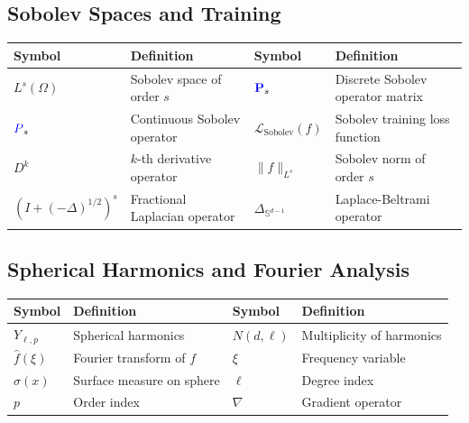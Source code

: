 \documentclass[a4paper]{article}
\theoremstyle{plain}
\theoremstyle{definition}
\theoremstyle{remark}
\begin{document}
\begin{tcolorbox}[colback=blue!5,colframe=blue!50!black,title={\large \textbf{Mathematical Notation Reference}},enhanced,drop shadow]

\newpage
\subsection*{Sobolev Spaces and Training}
\begin{longtable}{p{}p{}p{}p{}}
\toprule
\textbf{Symbol} & \textbf{Definition} & \textbf{Symbol} & \textbf{Definition} \\
\midrule
$L^s(\Omega)$ & Sobolev space of order $s$ & $\textcolor{blue}{\mathbf{P}}_s$ & Discrete Sobolev operator matrix \\
$\textcolor{blue}{P}_s$ & Continuous Sobolev operator & $\mathcal{L}_{\text{Sobolev}}(f)$ & Sobolev training loss function \\
$D^k$ & $k$-th derivative operator & $\|f\|_{L^s}$ & Sobolev norm of order $s$ \\
$(I + (-\Delta)^{1/2})^s$ & Fractional Laplacian operator & $\Delta_{\mathbb{S}^{d-1}}$ & Laplace-Beltrami operator \\
\bottomrule
\end{longtable}

\subsection*{Spherical Harmonics and Fourier Analysis}
\begin{longtable}{p{}p{}p{}p{}}
\toprule
\textbf{Symbol} & \textbf{Definition} & \textbf{Symbol} & \textbf{Definition} \\
\midrule
$Y_{\ell,p}$ & Spherical harmonics & $N(d,\ell)$ & Multiplicity of harmonics \\
$\hat{f}(\xi)$ & Fourier transform of $f$ & $\xi$ & Frequency variable \\
$\sigma(x)$ & Surface measure on sphere & $\ell$ & Degree index \\
$p$ & Order index & $\nabla$ & Gradient operator \\
\bottomrule
\end{longtable}


\end{tcolorbox}
\end{document}
